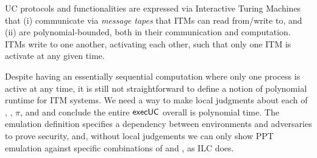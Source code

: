 UC protocols and functionalities are expressed via Interactive Turing Machines that (i) communicate via \emph{message tapes} that ITMs can read from/write to,
and (ii) are polynomial-bounded, both in their communication and computation.
ITMs write to one another, activating each other, such that only one ITM is activate at any given time.

Despite having an essentially sequential computation where only one process is active at any time,
it is still not straightforward to define a notion of polynomial runtime for ITM systems.
We need a way to make local judgments about each of \A, \Z, $\pi$, and \F and conclude the entire ${\mathsf {execUC}}$ overall is polynomial time. 
The emulation definition specifies a dependency between environments and adversaries to prove security, and, without local judgements we can only show PPT emulation against specific combinations of \Z and \A, as ILC does.

